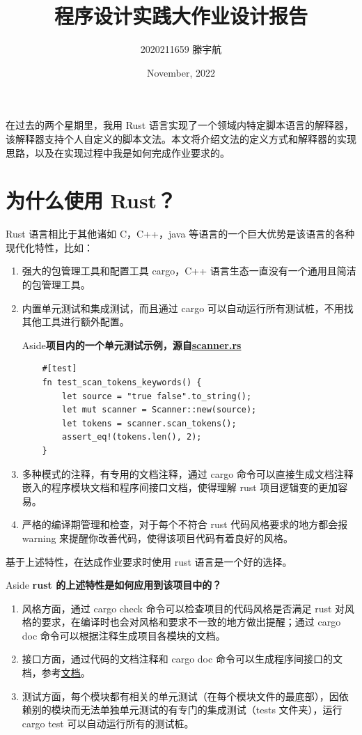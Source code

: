 \documentclass[12pt]{article}
\title{程序设计实践大作业设计报告}
\author{2020211659 滕宇航}
\date{November, 2022}
\newenvironment{aside}[1]
    { \begin{tcolorbox}[enlarge top by=0.5cm, enlarge bottom by=0.5cm] Aside\space\space\space\space \textbf{#1} \\
        } { \end{tcolorbox} }
\begin{document}
\maketitle 

    在过去的两个星期里，我用 Rust 语言实现了一个领域内特定脚本语言的解释器，该解释器支持个人自定义的脚本文法。本文将介绍文法的定义方式和解释器的实现思路，以及在实现过程中我是如何完成作业要求的。

    \section{为什么使用 Rust？}

    Rust 语言相比于其他诸如 C，C++，java 等语言的一个巨大优势是该语言的各种现代化特性，比如：

    \begin{enumerate}
        \item 强大的包管理工具和配置工具 cargo，C++ 语言生态一直没有一个通用且简洁的包管理工具。
        \item 内置单元测试和集成测试，而且通过 cargo 可以自动运行所有测试桩，不用找其他工具进行额外配置。
            \begin {aside}{项目内的一个单元测试示例，源自\href{../src/scanner.rs}{scanner.rs}}
                \begin{verbatim}
    #[test]
    fn test_scan_tokens_keywords() {
        let source = "true false".to_string();
        let mut scanner = Scanner::new(source);
        let tokens = scanner.scan_tokens();
        assert_eq!(tokens.len(), 2);
    }
                \end{verbatim}
            \end {aside}
        \item 多种模式的注释，有专用的文档注释，通过 cargo 命令可以直接生成文档注释嵌入的程序模块文档和程序间接口文档，使得理解 rust 项目逻辑变的更加容易。
        \item 严格的编译期管理和检查，对于每个不符合 rust 代码风格要求的地方都会报 warning 来提醒你改善代码，使得该项目代码有着良好的风格。
    \end{enumerate}

    基于上述特性，在达成作业要求时使用 rust 语言是一个好的选择。


    \begin{aside}{ rust 的上述特性是如何应用到该项目中的？}
        \begin{enumerate}
        \item 风格方面，通过 cargo check 命令可以检查项目的代码风格是否满足 rust 对风格的要求，在编译时也会对风格和要求不一致的地方做出提醒；通过 cargo doc 命令可以根据注释生成项目各模块的文档。
        \item 接口方面，通过代码的文档注释和 cargo doc 命令可以生成程序间接口的文档，参考\href{generate_by_cargo/robot_dsl/index.html}{文档}。
        \item 测试方面，每个模块都有相关的单元测试（在每个模块文件的最底部），因依赖别的模块而无法单独单元测试的有专门的集成测试（tests 文件夹），运行 cargo test 可以自动运行所有的测试桩。
        \end{enumerate}
    \end{aside}
\end{document}
